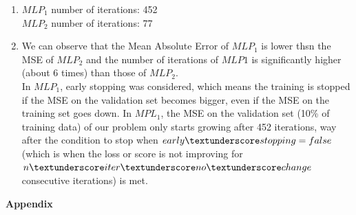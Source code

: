 \documentclass[12pt]{article}
\begin{document}
\begin{enumerate}[leftmargin=\labelsep,resume]
\item
$MLP_1$ number of iterations: 452 \\
$MLP_2$ number of iterations: 77

\item
We can observe that the Mean Absolute Error of $MLP_1$ is lower thsn the MSE of $MLP_2$ and the number of iterations of $MLP1$ is significantly higher (about 6 times) than those of $MLP_2$. \\
In $MLP_1$, early stopping was considered, which means the training is stopped if the MSE on the validation set becomes bigger, even if the MSE on the training set goes down. In $MPL_1$, the MSE on the validation set (10\% of training data) of our problem only starts growing after 452 iterations, way after the condition to stop when $early\textunderscore stopping = false$ (which is when the loss or score is not improving for $n\textunderscore iter\textunderscore no\textunderscore change$ consecutive iterations) is met.

\end{enumerate}
\newpage
\center\large{\textbf{Appendix}\vskip 0.3cm}
\end{document}
